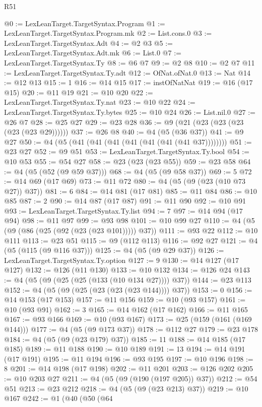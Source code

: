 \begin{lexlean}{R51}
\begin{coremodule}
@0 := LexLeanTarget.TargetSyntax.Program
@1 := LexLeanTarget.TargetSyntax.Program.mk
@2 := List.cons.{0}
@3 := LexLeanTarget.TargetSyntax.Adt
@4 := @2 @3
@5 := LexLeanTarget.TargetSyntax.Adt.mk
@6 := List.{0}
@7 := LexLeanTarget.TargetSyntax.Ty
@8 := @6 @7
@9 := @2 @8
@10 := @2 @7
@11 := LexLeanTarget.TargetSyntax.Ty.adt
@12 := OfNat.ofNat.{0}
@13 := Nat
@14 := @12 @13
@15 := 1
@16 := @14 @15
@17 := instOfNatNat
@19 := @16 (@17 @15)
@20 := @11 @19
@21 := @10 @20
@22 := LexLeanTarget.TargetSyntax.Ty.nat
@23 := @10 @22
@24 := LexLeanTarget.TargetSyntax.Ty.bytes
@25 := @10 @24
@26 := List.nil.{0}
@27 := @26 @7
@28 := @25 @27
@29 := @23 @28
@36 := @9 (@21 (@23 (@23 (@23 (@23 (@23 @29))))))
@37 := @26 @8
@40 := @4 (@5 (@36 @37))
@41 := @9 @27
@50 := @4 (@5 (@41 (@41 (@41 (@41 (@41 (@41 (@41 @37))))))))
@51 := @23 @27
@52 := @9 @51
@53 := LexLeanTarget.TargetSyntax.Ty.bool
@54 := @10 @53
@55 := @54 @27
@58 := @23 (@23 (@23 @55))
@59 := @23 @58
@64 := @4 (@5 (@52 (@9 @59 @37)))
@68 := @4 (@5 (@9 @58 @37))
@69 := 5
@72 := @14 @69 (@17 @69)
@73 := @11 @72
@80 := @4 (@5 (@9 (@23 (@10 @73 @27)) @37))
@81 := 6
@84 := @14 @81 (@17 @81)
@85 := @11 @84
@86 := @10 @85
@87 := 2
@90 := @14 @87 (@17 @87)
@91 := @11 @90
@92 := @10 @91
@93 := LexLeanTarget.TargetSyntax.Ty.list
@94 := 7
@97 := @14 @94 (@17 @94)
@98 := @11 @97
@99 := @93 @98
@101 := @10 @99 @27
@110 := @4 (@5 (@9 (@86 (@25 (@92 (@23 (@23 @101))))) @37))
@111 := @93 @22
@112 := @10 @111
@113 := @23 @51
@115 := @9 (@112 @113)
@116 := @92 @27
@121 := @4 (@5 (@115 (@9 @116 @37)))
@125 := @4 (@5 (@9 @29 @37))
@126 := LexLeanTarget.TargetSyntax.Ty.option
@127 := 9
@130 := @14 @127 (@17 @127)
@132 := @126 (@11 @130)
@133 := @10 @132
@134 := @126 @24
@143 := @4 (@5 (@9 (@25 (@25 (@133 (@10 @134 @27)))) @37))
@144 := @23 @113
@152 := @4 (@5 (@9 (@25 (@23 (@23 (@23 @144)))) @37))
@153 := 0
@156 := @14 @153 (@17 @153)
@157 := @11 @156
@159 := @10 (@93 @157)
@161 := @10 (@93 @91)
@162 := 3
@165 := @14 @162 (@17 @162)
@166 := @11 @165
@167 := @93 @166
@169 := @10 (@93 @167)
@173 := @25 (@159 (@161 (@169 @144)))
@177 := @4 (@5 (@9 @173 @37))
@178 := @112 @27
@179 := @23 @178
@184 := @4 (@5 (@9 (@23 @179) @37))
@185 := 11
@188 := @14 @185 (@17 @185)
@189 := @11 @188
@190 := @10 @189
@191 := 13
@194 := @14 @191 (@17 @191)
@195 := @11 @194
@196 := @93 @195
@197 := @10 @196
@198 := 8
@201 := @14 @198 (@17 @198)
@202 := @11 @201
@203 := @126 @202
@205 := @10 @203 @27
@211 := @4 (@5 (@9 (@190 (@197 @205)) @37))
@212 := @54 @51
@213 := @23 @212
@218 := @4 (@5 (@9 (@23 @213) @37))
@219 := @10 @167
@242 := @1
    (@40
      (@50
        (@64

\end{coremodule}
\end{lexlean}

